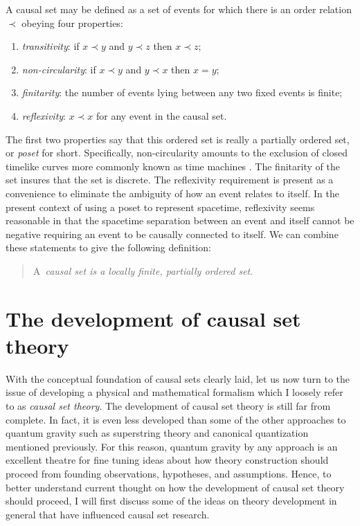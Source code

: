 \documentclass[aps,amssymb,12pt]{revtex4-2}
\begin{document}
A causal set may be defined as a set of events for which there is an order
relation $\prec $ obeying four properties:

\begin{enumerate}
\item  {\it transitivity}: if $x\prec y$ and $y\prec z$ then $x\prec z$;

\item  {\it non-circularity}: if $x\prec y$ and $y\prec x$ then $x=y$;

\item  {\it finitarity}: the number of events lying between any two fixed
events is finite;

\item  {\it reflexivity}: $x\prec x$ for any event in the causal set.
\end{enumerate}

The first two properties say that this ordered set is really a partially
ordered set, or {\it poset} for short. Specifically, non-circularity amounts
to the exclusion of closed timelike curves more commonly known as time
machines \cite{20}. The finitarity of the set insures that the set is discrete.
The reflexivity requirement is present as a convenience to eliminate the
ambiguity of how an event relates to itself. In the present context of using
a poset to represent spacetime, reflexivity seems reasonable in that the
spacetime separation between an event and itself cannot be negative
requiring an event to be causally connected to itself. We can combine these
statements to give the following definition:

\begin{quote}
A{\it \ causal set is a locally finite, partially ordered set}.
\end{quote}

\section{The development of causal set theory}

With the conceptual foundation of causal sets clearly laid, let us now turn
to the issue of developing a physical and mathematical formalism which I
loosely refer to as {\it causal set theory}. The development of causal set
theory is still far from complete. In fact, it is even less developed than
some of the other approaches to quantum gravity such as superstring theory
and canonical quantization mentioned previously. For this reason, quantum
gravity by any approach is an excellent theatre for fine tuning ideas about
how theory construction should proceed from founding observations,
hypotheses, and assumptions. Hence, to better understand current thought on
how the development of causal set theory should proceed, I will first
discuss some of the ideas on theory development in general that have
influenced causal set research.
\end{document}

